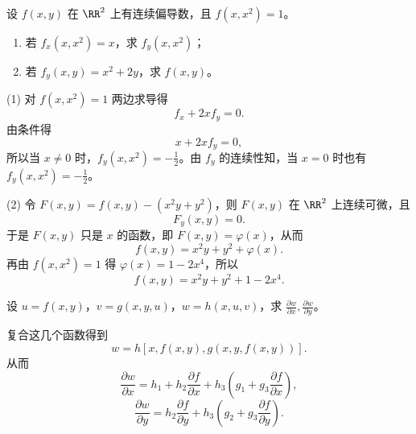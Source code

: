 \begin{xexample}[19.3.3]
设 $f(x,y)$ 在 $\RR^2$ 上有连续偏导数，且 $f(x,x^2)=1$。
\begin{enumerate}[label=(\arabic*)]
  \item 若 $f_x(x,x^2)=x$，求 $f_y(x,x^2)$；
  \item 若 $f_y(x,y)=x^2+2y$，求 $f(x,y)$。
\end{enumerate}
\end{xexample}
\begin{xsolution}
(1) 对 $f(x,x^2)=1$ 两边求导得
\[
  f_x+2xf_y=0.
\]
由条件得
\[
  x+2xf_y=0,
\]
所以当 $x\ne0$ 时，$f_y(x,x^2)=-\frac12$。由 $f_y$ 的连续性知，当 $x=0$ 时也有 $f_y(x,x^2)=-\frac12$。

(2) 令 $F(x,y)=f(x,y)-(x^2y+y^2)$，则 $F(x,y)$ 在 $\RR^2$ 上连续可微，且
\[
  F_y(x,y)=0.
\]
于是 $F(x,y)$ 只是 $x$ 的函数，即 $F(x,y)=\varphi(x)$，从而
\[
  f(x,y)=x^2y+y^2+\varphi(x).
\]
再由 $f(x,x^2)=1$ 得 $\varphi(x)=1-2x^4$，所以
\[
  f(x,y)=x^2y+y^2+1-2x^4.
\]
\end{xsolution}

\begin{xexample}[19.3.4]
设 $u=f(x,y)$，$v=g(x,y,u)$，$w=h(x,u,v)$，求 $\frac{\partial w}{\partial x},\frac{\partial w}{\partial y}$。
\end{xexample}
\begin{xsolution}
复合这几个函数得到
\[
  w=h[x,f(x,y),g(x,y,f(x,y))].
\]
从而
\[
  \frac{\partial w}{\partial x}
  =h_1+h_2\frac{\partial f}{\partial x}+h_3\left(g_1+g_3\frac{\partial f}{\partial x}\right),
\]
\[
  \frac{\partial w}{\partial y}
  =h_2\frac{\partial f}{\partial y}+h_3\left(g_2+g_3\frac{\partial f}{\partial y}\right).
\]
\end{xsolution}

